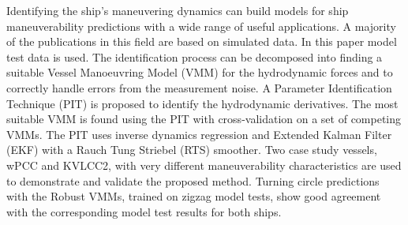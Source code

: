 Identifying the ship's maneuvering dynamics can build models for ship maneuverability predictions with a wide range of useful applications. 
A majority of the publications in this field are based on simulated data. In this paper model test data is used. The identification process can be decomposed into finding a suitable Vessel Manoeuvring Model (VMM) for the hydrodynamic forces and to correctly handle errors from the measurement noise. A Parameter Identification Technique (PIT) is proposed to identify the hydrodynamic derivatives. The most suitable VMM is found using the PIT with cross-validation on a set of competing VMMs. The PIT uses inverse dynamics regression and Extended Kalman Filter (EKF) with a Rauch Tung Striebel (RTS) smoother. Two case study vessels, wPCC and KVLCC2, with very different maneuverability characteristics are used to demonstrate and validate the proposed method. Turning circle predictions with the Robust VMMs, trained on zigzag model tests, show good agreement with the corresponding model test results for both ships.
